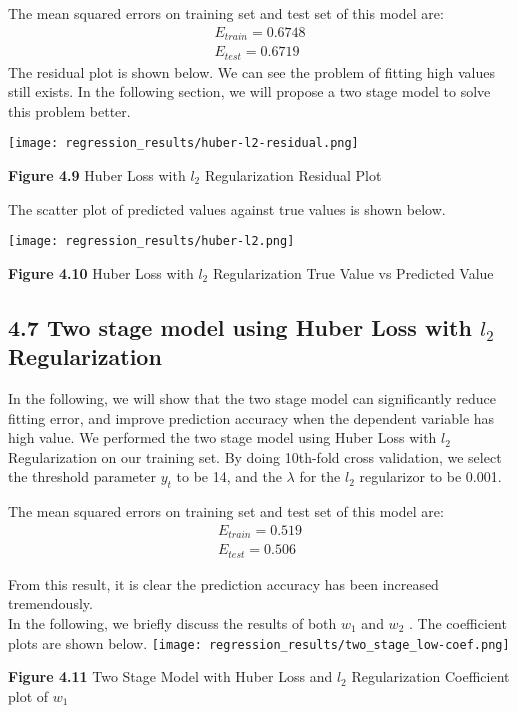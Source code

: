 \documentclass[9pt,twocolumn,twoside]{pnas-new}
\begin{document}
\noindent The mean squared errors on training set and test set of this model are:
\begin{align*}
E_{train} = 0.6748\\
E_{test} = 0.6719
\end{align*}
The residual plot is shown below. We can see the problem of fitting high values still exists. In the following section, we will propose a two stage model to solve this problem better.

\texttt{[image: regression\_results/huber-l2-residual.png]} 
\begin{center}
\textbf{Figure 4.9}  Huber Loss with $l_{2}$ Regularization Residual Plot
\end{center}

\noindent The scatter plot of predicted values against true values is shown below.

\texttt{[image: regression\_results/huber-l2.png]}
\begin{center}
\textbf{Figure 4.10}  Huber Loss with $l_{2}$ Regularization True Value vs Predicted Value
\end{center}






\subsection*{4.7 Two stage model using Huber Loss with $l_{2}$ Regularization}
In the following, we will show that the two stage model can significantly reduce fitting error, and improve prediction accuracy when the dependent variable has high value. We performed the two stage model using Huber Loss with $l_{2}$ Regularization on our training set. By doing 10th-fold cross validation, we select the threshold parameter $y_t$ to be 14, and the $\lambda$ for the $l_{2}$ regularizor to be 0.001.

\noindent The mean squared errors on training set and test set of this model are:
\begin{align*}
E_{train} = 0.519\\
E_{test} = 0.506
\end{align*}

\noindent From this result, it is clear the prediction accuracy has been increased tremendously.\\

\noindent In the following, we briefly discuss the results of both $w_1$ and $w_2$ . The coefficient plots are shown below.
%
\texttt{[image: regression\_results/two\_stage\_low-coef.png]} 
\begin{center}
\textbf{Figure 4.11} Two Stage Model with Huber Loss and $l_{2}$ Regularization Coefficient plot of $w_1$
\end{center}
\end{document}
